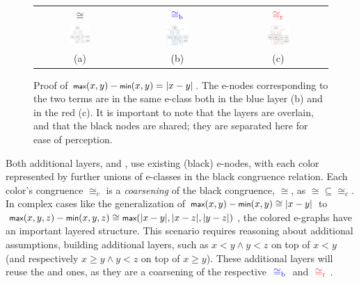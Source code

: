 \begin{figure}[t]
  \centering
  \begin{tabular}{@{}ccc@{}}
    $\cong$ & ${~\color{blue}\cong_{\mathrm{b}}\,\,}$ & ${~\color{red}\cong_{\mathrm{r}}\,\,}$ \\
    \includegraphics[width=0.25\textwidth]{colors/gfx/egraph-max-min.png} &
    \includegraphics[width=0.25\textwidth]{colors/gfx/egraph-max-min-blue.png} &
    \includegraphics[width=0.25\textwidth]{colors/gfx/egraph-max-min-red.png}
    \\
    {\small (a)} & {\small (b)} & {\small (c)}
  \end{tabular}
  \caption[Proof of $\tsmallmax(x,y)-\tsmallmin(x,y)=|x-y|$]{Proof of $\tsmallmax(x,y)-\tsmallmin(x,y)=|x-y|$.
  The e-nodes corresponding to the two terms are in the same e-class both in the blue layer (b) and in the red (c).
   It is important to note that the layers are overlain, and that the black nodes are shared; they are separated here for ease of perception.}
  \label{overview:egraph-max-min}
\end{figure}

Both additional layers, \cblue and \cred, use existing (black) e-nodes, with each color represented by further unions of e-classes in the black congruence relation. 
Each color's congruence $\cong_c$ is a \emph{coarsening} of the black congruence, $\cong$, as ${\cong}\subseteq{\cong_c}$.
In complex cases like the generalization of $\tmax(x,y)-\tmin(x,y) \cong |x-y|$ to $\tmax(x,y,z)-\tmin(x,y,z) \cong \tmax(|x-y|, |x-z|, |y-z|)$, the colored e-graphs have an important layered structure. 
This scenario requires reasoning about additional assumptions, building additional layers, such as $x < y \land y < z$ on top of $x < y$ (and respectively $x \ge y \land y < z$ on top of $x \ge y$). 
These additional layers will reuse the \cblue and \cred ones, as they are a coarsening of the respective ${~\color{blue}\cong_{\mathrm{b}}\,\,}$ and ${~\color{red}\cong_{\mathrm{r}}\,\,}$.

